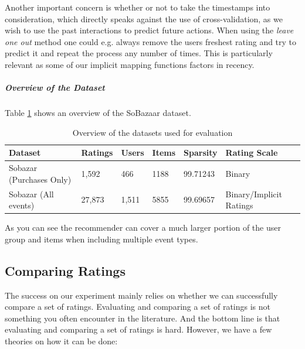 Another important concern is whether or not to take the timestamps into consideration,
which directly speaks against the use of cross-validation, as we wish to use the past
interactions to predict future actions. When using the \emph{leave one out} method one
could e.g. always remove the users freshest rating and try to predict it and repeat the
process any number of times. This is particularly relevant as some of our implicit mapping functions
factors in recency.

\subparagraph{Overview of the Dataset}

Table \ref{table:datasets} shows an overview of the SoBazaar dataset.


\begin{table}[H]
    \centering
    \begin{tabular}{l l l l l l }
    \toprule
	Dataset						& 	Ratings		& 	Users		& 	Items 		& 	Sparsity			& Rating Scale 				    \\ \midrule
	Sobazar	(Purchases Only) 	&	1,592		&	466			&	1188		&	99.71243			& Binary						\\
	Sobazar (All events)		& 	27,873  	& 	1,511		&	5855		& 	99.69657			& Binary/Implicit Ratings		\\
	\bottomrule
    \end{tabular}
    \caption [Overview of the datasets used for evaluation]{Overview of the datasets used for evaluation}
    \label{table:datasets}
\end{table}

As you can see the recommender can cover a much larger portion of the user group and items when including multiple event types.

\subsection{Comparing Ratings}

The success on our experiment mainly relies on whether we can successfully compare a set of ratings.
Evaluating and comparing a set of ratings is not something you often encounter in the literature. And the
bottom line is that evaluating and comparing a set of ratings is hard. However, we have a few theories on
how it can be done:

